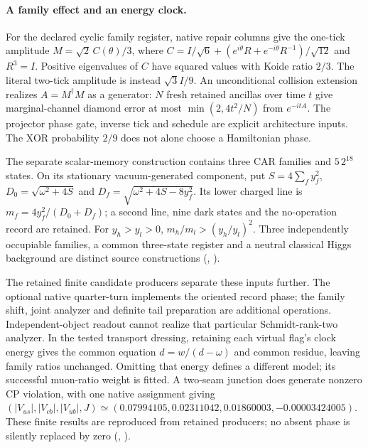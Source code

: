 \paragraph{A family effect and an energy clock.}
For the declared cyclic family register, native repair columns give the
one-tick amplitude $M=\sqrt2\,C(\theta)/3$, where
$C=I/\sqrt6+(e^{i\theta}R+e^{-i\theta}R^{-1})/\sqrt{12}$ and $R^3=I$.
Positive eigenvalues of $C$ have squared values with Koide ratio $2/3$.
The literal two-tick amplitude is instead $\sqrt3 I/9$.
An unconditional collision extension realizes $A=M^\dagger M$ as a
generator: $N$ fresh retained ancillas over time $t$ give marginal-channel
diamond error at most $\min(2,4t^2/N)$ from $e^{-itA}$. The projector
phase gate, inverse tick and schedule are explicit architecture inputs.
The XOR probability $2/9$ does not alone choose a Hamiltonian phase.

The separate scalar-memory construction contains three CAR families and
$5\,2^{18}$ states. On its stationary vacuum-generated component, put
$S=4\sum_f y_f^2$, $D_0=\sqrt{\omega^2+4S}$ and
$D_f=\sqrt{\omega^2+4S-8y_f^2}$. Its lower charged line is
$m_f=4y_f^2/(D_0+D_f)$; a second line, nine dark states and the no-operation
record are retained. For $y_h>y_l>0$, $m_h/m_l>(y_h/y_l)^2$.
Three independently occupiable families, a common three-state
register and a neutral classical Higgs background are distinct source
constructions
(, \cite{ophrepo}).

The retained finite candidate producers separate these inputs further.
The optional native quarter-turn implements the oriented record phase;
the family shift, joint analyzer and definite tail preparation are
additional operations. Independent-object readout cannot realize that
particular Schmidt-rank-two analyzer. In the tested transport dressing,
retaining each virtual flag's clock energy gives the common equation
$d=w/(d-\omega)$ and common residue, leaving family ratios unchanged.
Omitting that energy defines a different model; its successful
muon-ratio weight is fitted. A two-seam junction does generate nonzero
CP violation, with one native assignment giving
$(|V_{us}|,|V_{cb}|,|V_{ub}|,J)\simeq
(0.07994105,0.02311042,0.01860003,-0.00003424005)$.
These finite results are reproduced from retained producers;
no absent phase is silently replaced by zero
(, \cite{ophrepo}).

